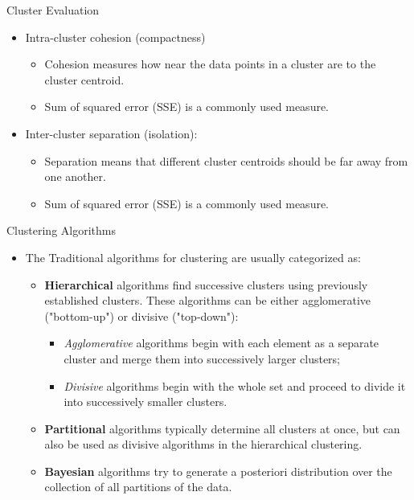 \documentclass[serif, aspectratio=169]{beamer}
\begin{document}
\begin{frame}{Cluster Evaluation}
    \begin{itemize}
        \item Intra-cluster cohesion (compactness)
        \begin{itemize}
            \item Cohesion measures how near the data points in a cluster are to the cluster centroid.
            \item Sum of squared error (SSE) is a commonly used measure.
        \end{itemize}
        \item Inter-cluster separation (isolation):
        \begin{itemize}
            \item Separation means that different cluster centroids should be far away from one another.
            \item Sum of squared error (SSE) is a commonly used measure.
        \end{itemize}
    \end{itemize}
\end{frame}

\begin{frame}{Clustering Algorithms}
\begin{itemize}
    \item The Traditional algorithms for clustering are usually categorized as: 
    \begin{itemize}
        \item \textbf{ Hierarchical} algorithms find successive clusters using previously established clusters. These algorithms can be either agglomerative ("bottom-up") or divisive ("top-down"):
\begin{itemize}
\item \textit{ Agglomerative } algorithms begin with each element as a separate cluster and merge them into successively larger clusters;
    \item \textit{ Divisive } algorithms begin with the whole set and proceed to divide it into successively smaller clusters.
\end{itemize}

\item \textbf{ Partitional } algorithms typically determine all clusters at once, but can also be used as divisive algorithms in the hierarchical clustering.

\item \textbf{ Bayesian} algorithms try to generate a posteriori distribution over the collection of all partitions of the data.

    \end{itemize}
\end{itemize}
\end{frame}
\end{document}
